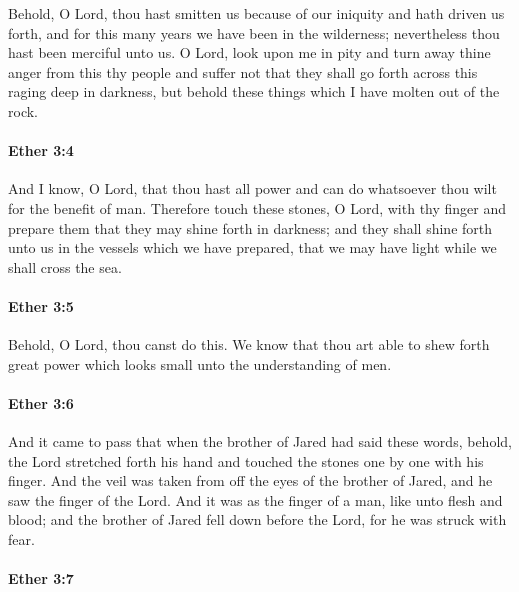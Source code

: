 			Behold, O Lord, thou hast smitten us because of our iniquity
			and hath driven us forth,
			and for this many years we have been in the wilderness;
			nevertheless thou hast been merciful unto us.
			O Lord, look upon me in pity
			and turn away thine anger from this thy people
			and suffer not that they shall go forth across this raging deep in darkness,
			but behold these things which I have molten out of the rock.

		\paragraph{Ether 3:4} %
			\label{ETHER-3-4}

			And I know, O Lord, that thou hast all power
			and can do whatsoever thou wilt for the benefit of man.
			Therefore touch these stones, O Lord, with thy finger
			and prepare them that they may shine forth in darkness;
			and they shall shine forth unto us in the vessels which we have prepared,
			that we may have light while we shall cross the sea.

		\paragraph{Ether 3:5} %
			\label{ETHER-3-5}

			Behold, O Lord, thou canst do this.
			We know that thou art able to shew forth great power
			which looks small unto the understanding of men.

		\paragraph{Ether 3:6} %
			\label{ETHER-3-6}

			 And it came to pass that when the brother of Jared had said these words,
			behold, the Lord stretched forth his hand
			and touched the stones one by one with his finger.
			And the veil was taken from off the eyes of the brother of Jared,
			and he saw the finger of the Lord.
			And it was as the finger of a man, like unto flesh and blood;
			and the brother of Jared fell down before the Lord,
			for he was struck with fear.

		\paragraph{Ether 3:7} %
			\label{ETHER-3-7}

